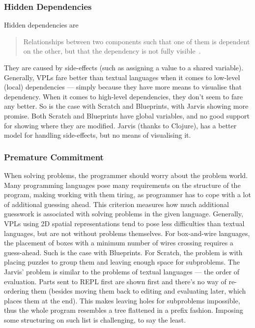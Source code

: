 \documentclass[english,mgr,shortabstract]{iithesis}
\begin{document}
\subsubsection*{Hidden Dependencies}
Hidden dependencies are
\blockquote{Relationships between two
  components such that one of them is dependent on the other, but that the
  dependency is not fully visible~\cite{Green96UsabilityAnalysis}.}

They are caused by side-effects (such as assigning a value to a shared
variable).
Generally, VPLs fare better than textual languages when it comes to low-level
(local) dependencies --- simply because they have more means to visualise that
dependency.
When it comes to high-level dependencies, they don’t seem to fare any better.
So is the case with Scratch and Blueprints, with Jarvis showing more promise.
Both Scratch and Blueprints have global variables, and no good support for
showing where they are modified.
Jarvis (thanks to Clojure), has a better model for handling side-effects, but no
means of visualising it.

\subsubsection*{Premature Commitment}
When solving problems, the programmer should worry about the problem world.
Many programming languages pose many requirements on the structure of the
program, making working with them tiring, as programmer has to cope with a lot
of additional guessing ahead.
This criterion measures how much additional guesswork is associated with solving
problems in the given language.
Generally, VPLs using 2D spatial representations tend to pose less difficulties
than textual languages, but are not without problems themselves.
For box-and-wire languages, the placement of boxes with a minimum number of
wires crossing requires a guess-ahead.
Such is the case with Blueprints.
For Scratch, the problem is with placing puzzles to group them and leaving
enough space for subproblems.
The Jarvis' problem is similar to the problems of textual languages --- the order
of evaluation.
Parts sent to REPL first are shown first and there’s no way of re-ordering them
(besides moving them back to editing and evaluating later, which places them at
the end).
This makes leaving holes for subproblems impossible, thus the whole program
resembles a tree flattened in a prefix fashion.
Imposing some structuring on such list is challenging, to say the least.
\end{document}

